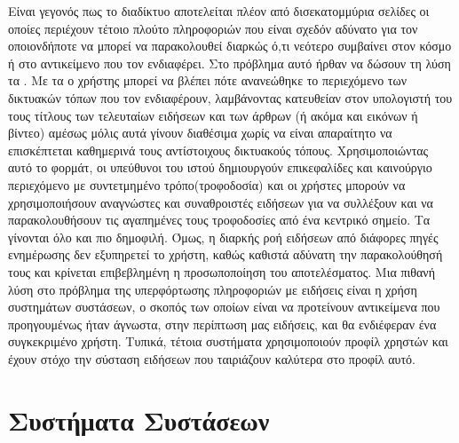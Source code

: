 Είναι γεγονός πως το διαδίκτυο αποτελείται πλέον από δισεκατομμύρια
σελίδες οι οποίες περιέχουν τέτοιο πλούτο πληροφοριών που είναι σχεδόν αδύνατο
για τον οποιονδήποτε να μπορεί να παρακολουθεί διαρκώς ό,τι νεότερο συμβαίνει στον
κόσμο ή στο αντικείμενο που τον ενδιαφέρει. Στο πρόβλημα αυτό ήρθαν να δώσουν τη
λύση τα {}. Με τα {} ο χρήστης μπορεί να βλέπει πότε ανανεώθηκε το
περιεχόμενο των δικτυακών τόπων που τον ενδιαφέρουν, λαμβάνοντας κατευθείαν
στον υπολογιστή του τους τίτλους των τελευταίων ειδήσεων και των άρθρων (ή ακόμα
και εικόνων ή βίντεο) αμέσως μόλις αυτά γίνουν διαθέσιμα χωρίς να είναι απαραίτητο
να επισκέπτεται καθημερινά τους αντίστοιχους δικτυακούς τόπους. Χρησιμοποιώντας
αυτό το φορμάτ, οι υπεύθυνοι του ιστού δημιουργούν επικεφαλίδες και καινούργιο
περιεχόμενο με συντετμημένο τρόπο(τροφοδοσία) και οι χρήστες μπορούν να
χρησιμοποιήσουν αναγνώστες {} και συναθροιστές ειδήσεων για να συλλέξουν και
να παρακολουθήσουν τις αγαπημένες τους τροφοδοσίες από ένα κεντρικό σημείο. Τα
{} γίνονται όλο και πιο δημοφιλή. Όμως, η διαρκής ροή ειδήσεων από διάφορες
πηγές ενημέρωσης δεν εξυπηρετεί το χρήστη, καθώς καθιστά αδύνατη την
παρακολούθησή τους και κρίνεται επιβεβλημένη η προσωποποίηση του
αποτελέσματος. Μια πιθανή λύση στο πρόβλημα της υπερφόρτωσης πληροφοριών με
ειδήσεις είναι η χρήση συστημάτων συστάσεων, ο σκοπός των οποίων είναι να
προτείνουν αντικείμενα που προηγουμένως ήταν άγνωστα, στην περίπτωση μας
ειδήσεις, και θα ενδιέφεραν ένα συγκεκριμένο χρήστη. Τυπικά, τέτοια συστήματα
χρησιμοποιούν προφίλ χρηστών και έχουν στόχο την σύσταση ειδήσεων που
ταιριάζουν καλύτερα στο προφίλ αυτό. 

\section{Συστήματα Συστάσεων}

